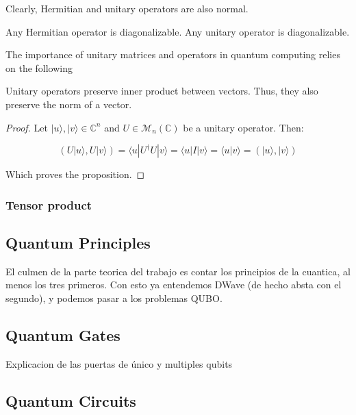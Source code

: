 Clearly, Hermitian and unitary operators are also normal.

\begin{corollary}
	Any Hermitian operator is diagonalizable. Any unitary operator is diagonalizable.
\end{corollary}

The importance of unitary matrices and operators in quantum computing relies on the following

\begin{proposition}
	Unitary operators preserve inner product between vectors. Thus, they also preserve the norm of a vector.
\end{proposition}

\begin{proof}
	Let $|u\rangle, |v\rangle \in \mathds{C}^n$ and $U \in \mathcal{M}_n(\mathds{C})$ be a unitary operator. Then:
	
	$$ ( U|u\rangle, U|v\rangle) = \langle u|U^\dagger U|v\rangle = \langle u|I|v\rangle = \langle u|v\rangle = ( |u\rangle, |v\rangle) $$
	
	Which proves the proposition.
\end{proof}

\subsubsection{Tensor product}






\subsection{Quantum Principles}

El culmen de la parte teorica del trabajo es contar los principios de la cuantica, al menos los tres primeros. Con esto ya entendemos DWave (de hecho absta con el segundo), y podemos pasar a los problemas QUBO.


\subsection{Quantum Gates}

Explicacion de las puertas de único y multiples qubits

\subsection{Quantum Circuits}

